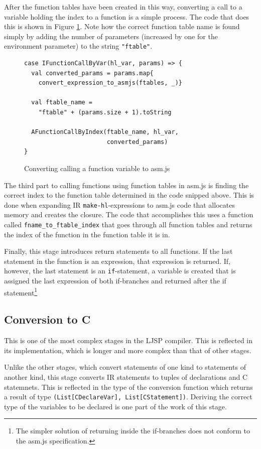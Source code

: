 \documentclass[11pt]{report}
\begin{document}
After the function tables have been created in this way, converting a call to a variable holding the index to a function is a simple process. The code that does this is shown in Figure \ref{iconvasmjs2}. Note how the correct function table name is found simply by adding the number of parameters (increased by one for the environment parameter) to the string \texttt{"ftable"}.

\begin{figure}[ht]
\begin{lstlisting}
case IFunctionCallByVar(hl_var, params) => {
  val converted_params = params.map{
    convert_expression_to_asmjs(ftables, _)}
    
  val ftable_name = 
    "ftable" + (params.size + 1).toString
    
  AFunctionCallByIndex(ftable_name, hl_var, 
                       converted_params)
}
\end{lstlisting}
\caption{Converting calling a function variable to asm.js}
\label{iconvasmjs2}
\end{figure}

The third part to calling functions using function tables in asm.js is finding the correct index to the function table determined in the code snipped above. This is done when expanding IR \texttt{make-hl}-expressions to asm.js code that allocates memory and creates the closure. The code that accomplishes this uses a function called \texttt{fname_to_ftable_index} that goes through all function tables and returns the index of the function in the function table it is in.

Finally, this stage introduces return statements to all functions. If the last statement in the function is an expression, that expression is returned. If, however, the last statement is an \texttt{if}-statement, a variable is created that is assigned the last expression of both if-branches and returned after the if statement\footnote{The simpler solution of returning inside the if-branches does not conform to the asm.js specification.}

\subsection{Conversion to C}
This is one of the most complex stages in the LJSP compiler. This is reflected in its implementation, which is longer and more complex than that of other stages.

Unlike the other stages, which convert statements of one kind to statements of another kind, this stage converts IR statements to tuples of declarations and C statemnets. This is reflected in the type of the conversion function which returns a result of type \texttt{(List[CDeclareVar], List[CStatement])}. Deriving the correct type of the variables to be declared is one part of the work of this stage.
\end{document}
